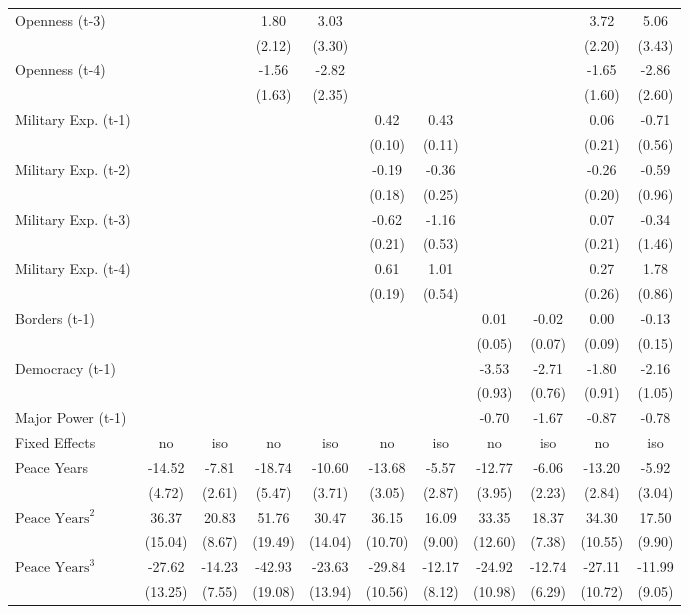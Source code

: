 \begin{tabular}{lcccccccccc}
Openness (t-3) &  &  & 1.80 & 3.03 &  &  &  &  & 3.72 & 5.06 \\
&  &  & (2.12) & (3.30) &  &  &  &  & (2.20) & (3.43) \\
Openness (t-4) &  &  & -1.56 & -2.82 &  &  &  &  & -1.65 & -2.86 \\
&  &  & (1.63) & (2.35) &  &  &  &  & (1.60) & (2.60) \\
Military Exp. (t-1) &  &  &  &  & 0.42 & 0.43 &  &  & 0.06 & -0.71 \\
&  &  &  &  & (0.10) & (0.11) &  &  & (0.21) & (0.56) \\
Military Exp. (t-2) &  &  &  &  & -0.19 & -0.36 &  &  & -0.26 & -0.59 \\
&  &  &  &  & (0.18) & (0.25) &  &  & (0.20) & (0.96) \\
Military Exp. (t-3) &  &  &  &  & -0.62 & -1.16 &  &  & 0.07 & -0.34 \\
&  &  &  &  & (0.21) & (0.53) &  &  & (0.21) & (1.46) \\
Military Exp. (t-4) &  &  &  &  & 0.61 & 1.01 &  &  & 0.27 & 1.78 \\
&  &  &  &  & (0.19) & (0.54) &  &  & (0.26) & (0.86) \\
Borders (t-1) &  &  &  &  &  &  & 0.01 & -0.02 & 0.00 & -0.13 \\
&  &  &  &  &  &  & (0.05) & (0.07) & (0.09) & (0.15) \\
Democracy (t-1) &  &  &  &  &  &  & -3.53 & -2.71 & -1.80 & -2.16 \\
&  &  &  &  &  &  & (0.93) & (0.76) & (0.91) & (1.05) \\
Major Power (t-1) &  &  &  &  &  &  & -0.70 & -1.67 & -0.87 & -0.78 \\
\midrule
Fixed Effects & no & iso & no & iso & no & iso & no & iso & no & iso \\
Peace Years & -14.52 & -7.81 & -18.74 & -10.60 & -13.68 & -5.57 & -12.77 & -6.06 & -13.20 & -5.92 \\
& (4.72) & (2.61) & (5.47) & (3.71) & (3.05) & (2.87) & (3.95) & (2.23) & (2.84) & (3.04) \\
$\text{Peace Years}^2$ & 36.37 & 20.83 & 51.76 & 30.47 & 36.15 & 16.09 & 33.35 & 18.37 & 34.30 & 17.50 \\
& (15.04) & (8.67) & (19.49) & (14.04) & (10.70) & (9.00) & (12.60) & (7.38) & (10.55) & (9.90) \\
$\text{Peace Years}^3$ & -27.62 & -14.23 & -42.93 & -23.63 & -29.84 & -12.17 & -24.92 & -12.74 & -27.11 & -11.99 \\
& (13.25) & (7.55) & (19.08) & (13.94) & (10.56) & (8.12) & (10.98) & (6.29) & (10.72) & (9.05) \\

\end{tabular}
